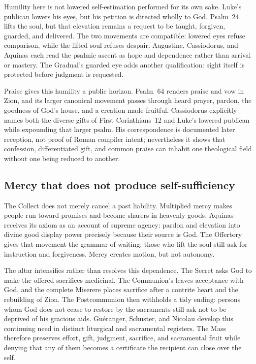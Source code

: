 Humility here is not lowered self-estimation performed for its own sake.
Luke's publican lowers his eyes, but his petition is directed wholly to God.
Psalm~24 lifts the soul, but that elevation remains a request to be taught,
forgiven, guarded, and delivered.  The two movements are compatible: lowered
eyes refuse comparison, while the lifted soul refuses despair.  Augustine,
Cassiodorus, and Aquinas each read the psalmic ascent as hope and dependence
rather than arrival or mastery.  The Gradual's guarded eye adds another
qualification: sight itself is protected before judgment is requested.

Praise gives this humility a public horizon.  Psalm~64 renders praise and vow
in Zion, and its larger canonical movement passes through heard prayer,
pardon, the goodness of God's house, and a creation made fruitful.  Cassiodorus
explicitly names both the diverse gifts of First Corinthians~12 and Luke's
lowered publican while expounding that larger psalm.  His correspondence is
documented later reception, not proof of Roman compiler intent; nevertheless
it shows that confession, differentiated gift, and common praise can inhabit
one theological field without one being reduced to another.

\subsection*{Mercy that does not produce self-sufficiency}

The Collect does not merely cancel a past liability.  Multiplied mercy makes
people run toward promises and become sharers in heavenly goods.  Aquinas
receives its axiom as an account of supreme agency: pardon and elevation into
divine good display power precisely because their source is God.  The
Offertory gives that movement the grammar of waiting; those who lift the soul
still ask for instruction and forgiveness.  Mercy creates motion, but not
autonomy.

The altar intensifies rather than resolves this dependence.  The Secret asks
God to make the offered sacrifices medicinal.  The Communion's
 leaves acceptance with God, and the complete Miserere
places sacrifice after a contrite heart and the rebuilding of Zion.  The
Postcommunion then withholds a tidy ending: persons whom God does not cease to
restore by the sacraments still ask not to be deprived of his gracious aids.
Guéranger, Schuster, and Nicolau develop this continuing need in distinct
liturgical and sacramental registers.  The Mass therefore preserves effort,
gift, judgment, sacrifice, and sacramental fruit while denying that any of
them becomes a certificate the recipient can close over the self.

